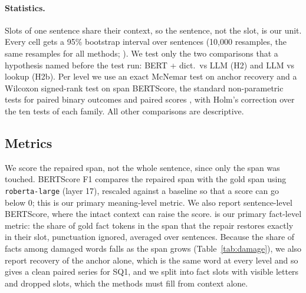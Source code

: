 \paragraph{Statistics.} Slots of one sentence share their context, so the sentence, not the slot, is our unit. Every
cell gets a 95\% bootstrap interval over sentences (10,000 resamples, the same resamples for all methods;
\citealp{koehn2004statistical,dror2018hitchhiker}). We test only the two comparisons that a hypothesis named before
the test run: BERT + dict.\ vs LLM (H2) and LLM vs lookup (H2b). Per level we use an exact McNemar test on anchor
recovery and a Wilcoxon signed-rank test on span BERTScore, the standard non-parametric tests for paired binary
outcomes and paired scores \citep{dror2018hitchhiker}, with Holm's correction \citep{holm1979simple} over the ten tests of each family. All other comparisons are descriptive.

\subsection{Metrics}
\label{sec:metrics}
We score the repaired span, not the whole sentence, since only the span was touched. BERTScore F1
\citep{zhang2020bertscore} compares the repaired span with the gold span using \texttt{roberta-large} (layer 17),
rescaled against a baseline so that a score can go below 0; this is our primary meaning-level metric. We also report
sentence-level BERTScore, where the intact context can raise the score. \frr{} is our primary fact-level metric: the
share of gold fact tokens in the span that the repair restores exactly in their slot, punctuation ignored, averaged over sentences. Because
the share of facts among damaged words falls as the span grows (Table~\ref{tab:damage}), we also report recovery of
the anchor alone, which is the same word at every level and so gives a clean paired series for SQ1, and we split
\frr{} into fact slots with visible letters and dropped slots, which the methods must fill from context alone.

